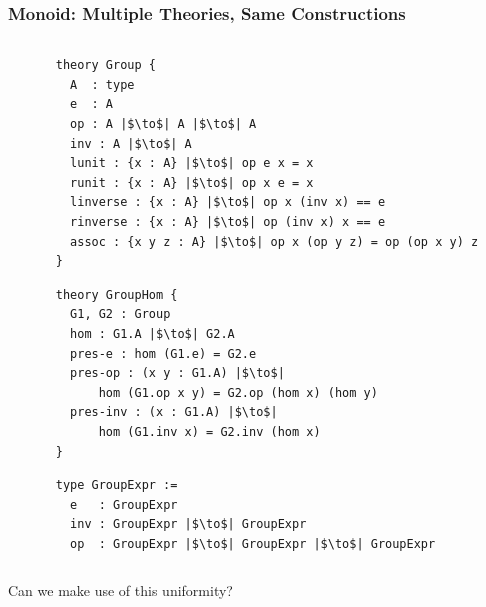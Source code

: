\documentclass[t,10pt,numbers,fleqn,usenames,xcolor=dvipsnames]{beamer}
\begin{document}
\begin{frame}[fragile]
\frametitle{Monoid: Multiple Theories, Same Constructions}
\begin{columns}
    \begin{column}{0.45\textwidth}

\vspace{0.65cm}

\vspace{0.35cm}          

     \end{column} 
     \begin{column}{0.45\textwidth}
     
        \begin{verbatim}
theory Group {
  A  : type 
  e  : A
  op : A |$\to$| A |$\to$| A
  inv : A |$\to$| A
  lunit : {x : A} |$\to$| op e x = x
  runit : {x : A} |$\to$| op x e = x
  linverse : {x : A} |$\to$| op x (inv x) == e
  rinverse : {x : A} |$\to$| op (inv x) x == e
  assoc : {x y z : A} |$\to$| op x (op y z) = op (op x y) z 
}
        \end{verbatim}     
\begin{verbatim}  
theory GroupHom { 
  G1, G2 : Group 
  hom : G1.A |$\to$| G2.A
  pres-e : hom (G1.e) = G2.e
  pres-op : (x y : G1.A) |$\to$| 
      hom (G1.op x y) = G2.op (hom x) (hom y)
  pres-inv : (x : G1.A) |$\to$| 
      hom (G1.inv x) = G2.inv (hom x)  
}
\end{verbatim}  
\begin{verbatim}  
type GroupExpr := 
  e   : GroupExpr 
  inv : GroupExpr |$\to$| GroupExpr
  op  : GroupExpr |$\to$| GroupExpr |$\to$| GroupExpr
\end{verbatim}           
\end{column}
\end{columns} 
\pause
Can we make use of this uniformity? 
\end{frame}
\end{document}
